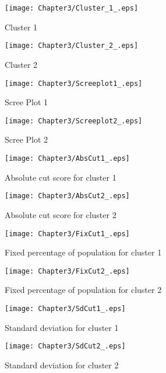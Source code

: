 \begin{figure}[htb]
\centering
\begin{minipage}{0.45\linewidth}
\texttt{[image: Chapter3/Cluster\_1\_.eps]}
\caption{Cluster 1}
\end{minipage}
\quad
\begin{minipage}{0.45\linewidth}
\texttt{[image: Chapter3/Cluster\_2\_.eps]}
\caption{Cluster 2}
\end{minipage}
\end{figure}
\pagebreak

\begin{figure}[htb]
\centering
\begin{minipage}{0.45\linewidth}
\texttt{[image: Chapter3/Screeplot1\_.eps]}
\caption{Scree Plot 1}
\end{minipage}
\quad
\begin{minipage}{0.45\linewidth}
\texttt{[image: Chapter3/Screeplot2\_.eps]}
\caption{Scree Plot 2}
\end{minipage}
\end{figure}
\pagebreak

\begin{figure}[htb]
\centering
\begin{minipage}{0.45\linewidth}
\texttt{[image: Chapter3/AbsCut1\_.eps]}
\caption{Absolute cut score for cluster 1}
\end{minipage}
\quad
\begin{minipage}{0.45\linewidth}
\texttt{[image: Chapter3/AbsCut2\_.eps]}
\caption{Absolute cut score for cluster 2}
\end{minipage}
\end{figure}

\begin{figure}[htb]
\centering
\begin{minipage}{0.45\linewidth}
\texttt{[image: Chapter3/FixCut1\_.eps]}
\caption{Fixed percentage of population for cluster 1}
\end{minipage}
\quad
\begin{minipage}{0.45\linewidth}
\texttt{[image: Chapter3/FixCut2\_.eps]}
\caption{Fixed percentage of population for cluster 2}
\end{minipage}
\end{figure}
\pagebreak

\begin{figure}[htb]
\centering
\begin{minipage}{0.45\linewidth}
\texttt{[image: Chapter3/SdCut1\_.eps]}
\caption{Standard deviation for cluster 1}
\end{minipage}
\quad
\begin{minipage}{0.45\linewidth}
\texttt{[image: Chapter3/SdCut2\_.eps]}
\caption{Standard deviation for cluster 2}
\end{minipage}
\end{figure}

